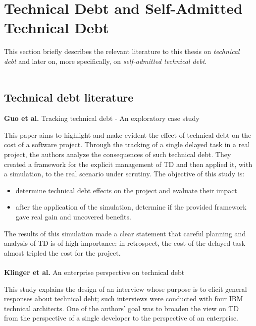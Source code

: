 \section{Technical Debt and Self-Admitted Technical Debt} %

This section briefly describes the relevant literature to this thesis on \emph{technical debt} and later on, more specifically, on \emph{self-admitted technical debt}.
\\
\\
\subsection{Technical debt literature}
\textbf{Guo et al.} \cite{guo2011tracking} Tracking technical debt - An exploratory case study

This paper aims to highlight and make evident the effect of technical debt on the cost of a software project. Through the tracking of a single delayed task in a real project, the authors analyze the consequences of such technical debt. They created a framework for the explicit management of TD and then applied it, with a simulation, to the real scenario under scrutiny.
The objective of this study is:
\begin{itemize}
    \item determine technical debt effects on the project and evaluate their impact
    \item after the application of the simulation, determine if the provided framework gave real gain and uncovered benefits.
\end{itemize}
The results of this simulation made a clear statement that careful planning and analysis of TD is of high importance: in retrospect, the cost of the delayed task almost tripled the cost for the project.
\\
\\
\textbf{Klinger et al.} \cite{klinger2011enterprise} An enterprise perspective on technical debt

This study explains the design of an interview whose purpose is to elicit general responses about technical debt; such interviews were conducted with four IBM technical architects. One of the authors' goal was to broaden the view on TD from the perspective of a single developer to the perspective of an enterprise.

